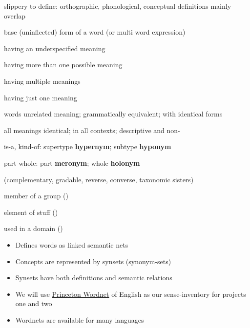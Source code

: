 \documentclass[a4paper,landscape,headrule,footrule,xetex]{foils}
\begin{document}
\begin{description}
\item {} slippery to define: orthographic, phonological, conceptual definitions mainly overlap
\item {} base (uninflected) form of a word (or multi word expression)
\item {} having an underspecified meaning
\item {} having more than one possible meaning
 \item {}
   
   \begin{description}
   \item {} having multiple meanings
   \item {} having just one meaning
   \item {} words unrelated meaning; grammatically equivalent;
     with identical forms
\end{description} 
\end{description}

\begin{description}
\item {}  all meanings identical; in all contexts; descriptive and non-
\item {} is-a, kind-of: supertype \textbf{hypernym}; subtype \textbf{hyponym}
\item {} part-whole: part \textbf{meronym}; whole \textbf{holonym}
\item {} (complementary, gradable, reverse, converse, taxonomic sisters)
\item {} member of a group ()
\item {} element of stuff ()
\item {}  used in a domain ()
\end{description}


\begin{itemize}
\item Defines words as linked semantic nets
\item Concepts are represented by synsets (synonym-sets)
\item Synsets have both definitions and semantic relations
\item We will use  \href{https://wordnet.princeton.edu/}{Princeton Wordnet} of English as our sense-inventory for projects one and two
\item Wordnets are available for many languages

\end{itemize}
\end{document}
